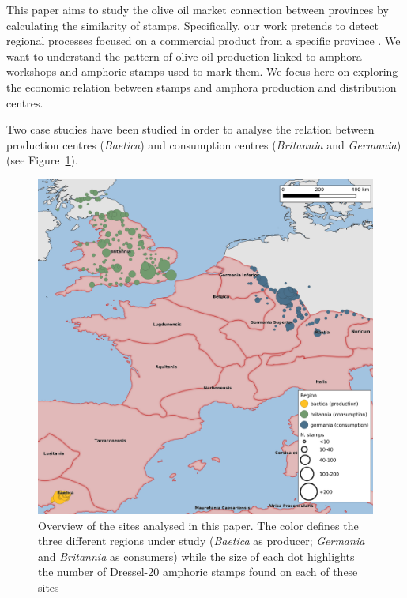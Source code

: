 \documentclass[review]{elsarticle}
\begin{document}
This paper aims to study the olive oil market connection between provinces by calculating the similarity of stamps. Specifically, our work pretends to detect regional processes focused on a commercial product from a specific province \citep{isaksen_network_2006}. We want to understand the pattern of olive oil production linked to amphora workshops and amphoric stamps used to mark them. We focus here on exploring the economic relation between stamps and amphora production and distribution centres. 

Two case studies have been studied in order to analyse the relation between production centres (\textit{Baetica}) and consumption centres (\textit{Britannia} and \textit{Germania}) (see Figure~\ref{general}).

\begin{figure}[htp]
	\centering
\includegraphics[width=\linewidth]{figs/general_map}
\caption{Overview of the sites analysed in this paper. The color defines the three different regions under study (\textit{Baetica} as producer; \textit{Germania} and \textit{Britannia} as consumers) while the size of each dot highlights the number of Dressel-20 amphoric stamps found on each of these sites}

\label{general}
\end{figure} 
        
\end{document}
